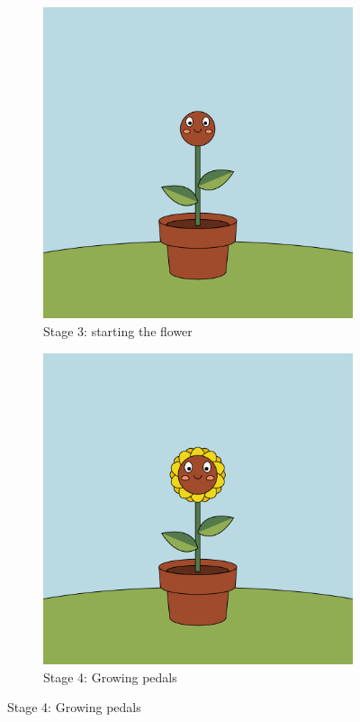 \begin{figure}[H]
\begin{subfigure}[t]{.35\textwidth}
    \end{subfigure}
    \begin{subfigure}[t]{.35\textwidth}
        \centering

        \includegraphics[width=\linewidth]{Figures/day_2/stage_3.png}
        \caption{Stage 3: starting the flower}
        \label{fig: animation stage 3}

    \end{subfigure}
    \hspace{1cm}
    \begin{subfigure}[t]{.35\textwidth}
        \centering

        \includegraphics[width=\linewidth]{Figures/day_2/stage_4.png}
        \caption{Stage 4: Growing pedals}
        \label{fig: animation stage 4}


\end{subfigure}
\end{figure}
